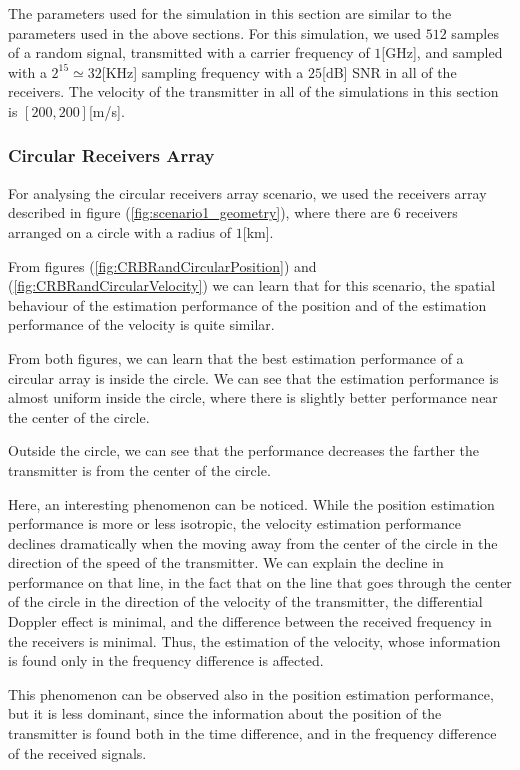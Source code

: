 The parameters used for the simulation in this section are similar to the parameters used in the above sections. For this simulation, we used $512$ samples of a random signal, transmitted with a carrier frequency of $1$[GHz], and sampled with a $2^{15} \simeq 32$[KHz] sampling frequency with a $25$[dB] SNR in all of the receivers. The velocity of the transmitter in all of the simulations in this section is $[200,200]$[m/s].

\subsubsection*{Circular Receivers Array}
For analysing the circular receivers array scenario, we used the receivers array described in figure (\ref{fig:scenario1_geometry}), where there are 6 receivers arranged on a circle with a radius of $1$[km].

From figures (\ref{fig:CRBRandCircularPosition}) and (\ref{fig:CRBRandCircularVelocity}) we can learn that for this scenario, the spatial behaviour of the estimation performance of the position and of the estimation performance of the velocity is quite similar.

From both figures, we can learn that the best estimation performance of a circular array is inside the circle. We can see that the estimation performance is almost uniform inside the circle, where there is slightly better performance near the center of the circle.

Outside the circle, we can see that the performance decreases the farther the transmitter is from the center of the circle. 

Here, an interesting phenomenon can be noticed. While the position estimation performance is more or less isotropic, the velocity estimation performance declines dramatically when the moving away from the center of the circle in the direction of the speed of the transmitter. We can explain the decline in performance on that line, in the fact that on the line that goes through the center of the circle in the direction of the velocity of the transmitter, the differential Doppler effect is minimal, and the difference between the received frequency in the receivers is minimal. Thus, the estimation of the velocity, whose information is found only in the frequency difference is affected. 

This phenomenon can be observed also in the position estimation performance, but it is less dominant, since the information about the position of the transmitter is found both in the time difference, and in the frequency difference of the received signals.


